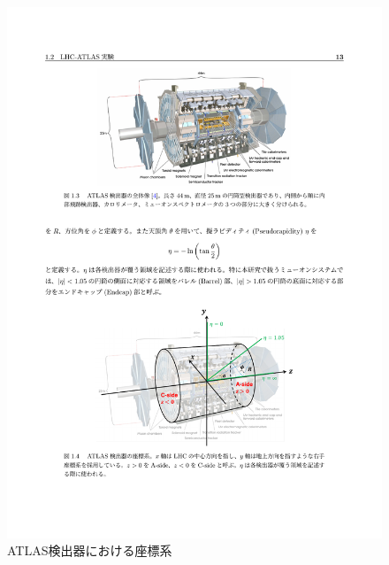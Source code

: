 \begin{figure} 
\centering
\includegraphics[width=16cm]{fig/Intro/ATLAScordination.pdf}
\caption[ATLAS検出器における座標系]{ATLAS検出器における座標系}
\label{ATLAScordination}
\end{figure}



